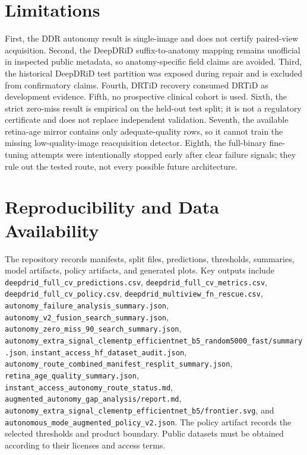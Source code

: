 \documentclass[journal]{IEEEtran}
\begin{document}
\section{Limitations}
First, the DDR autonomy result is single-image and does not certify paired-view acquisition. Second, the DeepDRiD suffix-to-anatomy mapping remains unofficial in inspected public metadata, so anatomy-specific field claims are avoided. Third, the historical DeepDRiD test partition was exposed during repair and is excluded from confirmatory claims. Fourth, DRTiD recovery consumed DRTiD as development evidence. Fifth, no prospective clinical cohort is used. Sixth, the strict zero-miss result is empirical on the held-out test split; it is not a regulatory certificate and does not replace independent validation. Seventh, the available retina-age mirror contains only adequate-quality rows, so it cannot train the missing low-quality-image reacquisition detector. Eighth, the full-binary fine-tuning attempts were intentionally stopped early after clear failure signals; they rule out the tested route, not every possible future architecture.

\section{Reproducibility and Data Availability}
The repository records manifests, split files, predictions, thresholds, summaries, model artifacts, policy artifacts, and generated plots. Key outputs include \texttt{deepdrid\_full\_cv\_predictions.csv}, \texttt{deepdrid\_full\_cv\_metrics.csv}, \texttt{deepdrid\_full\_cv\_policy.csv}, \texttt{deepdrid\_multiview\_fn\_rescue.csv}, \texttt{autonomy\_failure\_analysis\_summary.json}, \texttt{autonomy\_v2\_fusion\_search\_summary.json}, \texttt{autonomy\_zero\_miss\_90\_search\_summary.json}, \texttt{autonomy\_extra\_signal\_clementp\_efficientnet\_b5\_random5000\_fast/summary.json}, \texttt{instant\_access\_hf\_dataset\_audit.json}, \texttt{autonomy\_route\_combined\_manifest\_resplit\_summary.json}, \texttt{retina\_age\_quality\_summary.json}, \texttt{instant\_access\_autonomy\_route\_status.md}, \texttt{augmented\_autonomy\_gap\_analysis/report.md}, \texttt{autonomy\_extra\_signal\_clementp\_efficientnet\_b5/frontier.svg}, and \texttt{autonomous\_mode\_augmented\_policy\_v2.json}. The policy artifact records the selected thresholds and product boundary. Public datasets must be obtained according to their licenses and access terms.
\end{document}
